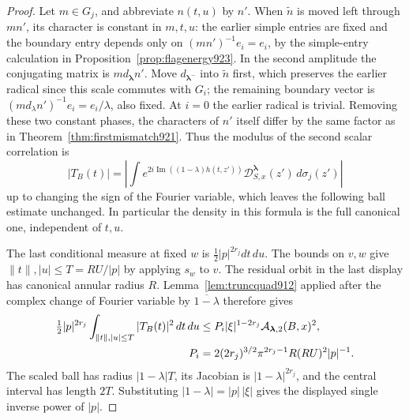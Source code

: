 \documentclass[a4paper,11pt]{article}
\theoremstyle{definition}
\theoremstyle{remark}
\numberwithin{equation}{section}
\begin{document}
\begin{proof}
Let \(m\in G_j\), and abbreviate \(n(t,u)\) by \(n'\).
When \(\widetilde n\) is moved left through \(m n'\), its
character is constant in \(m,t,u\): the earlier simple entries
are fixed and the boundary entry depends only on
\((mn')^{-1}e_i=e_i\), by the simple-entry calculation in
Proposition~\ref{prop:flagenergy923}. In the second amplitude
the conjugating matrix is \(m d_{\boldsymbol\lambda} n'\).
Move \(d_{\boldsymbol\lambda^-}\) into \(\widetilde n\) first,
which preserves the earlier radical since this scale commutes
with \(G_i\); the remaining boundary vector is
\((m d_\lambda n')^{-1}e_i=e_i/\lambda\), also fixed.
At \(i=0\) the earlier radical is trivial. Removing these two
constant phases, the characters of \(n'\) itself differ by the
same factor as in Theorem~\ref{thm:firstmismatch921}. Thus the
modulus of the second scalar correlation is
\[
 |T_B(t)|=\left|\int
 e^{2i\operatorname{Im}((1-\lambda)h(t,z'))}
      \mathcal D^{\boldsymbol\lambda}_{S,x}(z')\,d\sigma_j(z')\right|
\]
up to changing the sign of the Fourier variable, which leaves
the following ball estimate unchanged. In particular the density
in this formula is the full canonical one, independent of \(t,u\).

The last conditional measure at fixed \(w\) is
\(\tfrac12|p|^{2r_j}dt\,du\).
The bounds on \(v,w\) give
\(\|t\|,|u|\le T=RU/|p|\) by applying \(s_w\) to \(v\).
The residual orbit in the last display has canonical annular
radius \(R\). Lemma~\ref{lem:truncquad912} applied after the
complex change of Fourier variable by \(\overline{1-\lambda}\)
therefore gives
\begin{align}
 \tfrac12|p|^{2r_j}\int_{\|t\|,|u|\le T}|T_B(t)|^2\,dt\,du
 &\le P_i|\xi|^{1-2r_j}
           \mathcal A_{\boldsymbol\lambda,2}(B,x)^2, \notag\\
 P_i&=2(2r_j)^{3/2}\pi^{2r_j-1}R(RU)^2|p|^{-1}.
 \label{eq:lastflagplancherel925}
\end{align}
The scaled ball has radius \(|1-\lambda|T\), its Jacobian
is \(|1-\lambda|^{2r_j}\), and the central interval has length
\(2T\). Substituting \(|1-\lambda|=|p|\,|\xi|\) gives the
displayed single inverse power of \(|p|\).


\end{proof}
\end{document}
